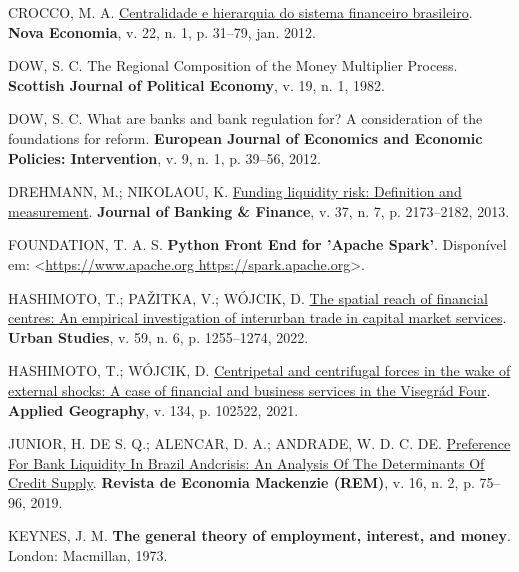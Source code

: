 \documentclass[a4paper,12pt]{article}
\newlength{\cslhangindent}
\newlength{\cslentryspacingunit} %
\newenvironment{CSLReferences}[2] %
 {%
  \setlength{\parindent}{0pt}
  \ifodd #1
  \let\oldpar\par
  \def\par{\hangindent=\cslhangindent\oldpar}
  \fi
  \setlength{\parskip}{#2\cslentryspacingunit}
 }%
 {}
\begin{document}
\begin{CSLReferences}{0}{1}
\leavevmode{}%
CROCCO, M. A.
\href{https://doi.org/10.1590/S0103-63512012000100002}{Centralidade e
hierarquia do sistema financeiro brasileiro}. \textbf{Nova Economia}, v.
22, n. 1, p. 31--79, jan. 2012.

\leavevmode{}%
DOW, S. C. The Regional Composition of the Money Multiplier Process.
\textbf{Scottish Journal of Political Economy}, v. 19, n. 1, 1982.

\leavevmode{}%
DOW, S. C. What are banks and bank regulation for? A consideration of
the foundations for reform. \textbf{European Journal of Economics and
Economic Policies: Intervention}, v. 9, n. 1, p. 39--56, 2012.

\leavevmode{}%
DREHMANN, M.; NIKOLAOU, K.
\href{https://doi.org/10.1016/j.jbankfin.2012.01.002}{Funding liquidity
risk: Definition and measurement}. \textbf{Journal of Banking \&
Finance}, v. 37, n. 7, p. 2173--2182, 2013.

\leavevmode{}%
FOUNDATION, T. A. S. \textbf{Python Front End for 'Apache Spark'}.
Disponível em:
\textless{}\href{https://www.apache.org\%20https://spark.apache.org}{https://www.apache.org
https://spark.apache.org}\textgreater.

\leavevmode{}%
HASHIMOTO, T.; PAŽITKA, V.; WÓJCIK, D.
\href{https://doi.org/10.1177/0042098021999992}{The spatial reach of
financial centres: An empirical investigation of interurban trade in
capital market services}. \textbf{Urban Studies}, v. 59, n. 6, p.
1255--1274, 2022.

\leavevmode{}%
HASHIMOTO, T.; WÓJCIK, D.
\href{https://doi.org/10.1016/j.apgeog.2021.102522}{Centripetal and
centrifugal forces in the wake of external shocks: A case of financial
and business services in the Visegrád Four}. \textbf{Applied Geography},
v. 134, p. 102522, 2021.

\leavevmode{}%
JUNIOR, H. DE S. Q.; ALENCAR, D. A.; ANDRADE, W. D. C. DE.
\href{https://doi.org/-}{Preference For Bank Liquidity In Brazil
Andcrisis: An Analysis Of The Determinants Of Credit Supply}.
\textbf{Revista de Economia Mackenzie (REM)}, v. 16, n. 2, p. 75--96,
2019.

\leavevmode{}%
KEYNES, J. M. \textbf{The general theory of employment, interest, and
money}. London: Macmillan, 1973.


\end{CSLReferences}
\end{document}
